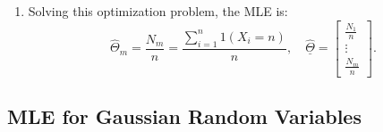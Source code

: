 \begin{example}
\begin{enumerate}
        \item Solving this optimization problem, the MLE is:
        \[
        \hat{\Theta}_m = \frac{N_m}{n} = \frac{\sum_{i=1}^{n} 1(X_i = n)}{n}, \quad \underline{\hat{\Theta}} = 
        \begin{bmatrix}
        \frac{N_1}{n} \\
        \vdots \\
        \frac{N_m}{n}
        \end{bmatrix}.
        \]
    \end{enumerate}
\end{example}
\newpage

\subsection{MLE for Gaussian Random Variables}
